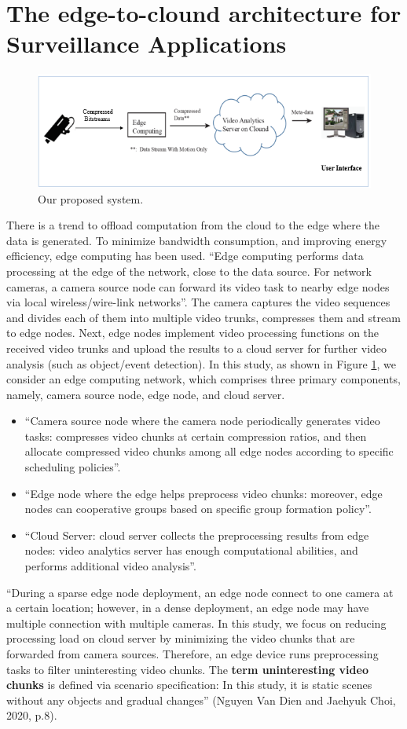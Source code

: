 \section{The edge-to-clound architecture for Surveillance Applications}
\begin{figure}
\centering
 \includegraphics[width=1.0\linewidth]{Figures/arch.png}
 \caption{ Our proposed system.}
 \label{fig:arch}
\end{figure}
There is a trend to offload computation from the cloud to the edge where the data is generated. To minimize bandwidth consumption, and improving energy efficiency, edge computing has been used. “Edge computing performs data processing at the edge of the network, close to the data source. For network cameras, a camera source node can forward its video task to nearby edge nodes via local wireless/wire-link networks”. The camera captures the video sequences and divides each of them into multiple video trunks, compresses them and stream to edge nodes. Next, edge nodes implement video processing functions on the received video trunks and upload the results to a cloud server for further video analysis (such as object/event detection). In this study, as shown in Figure \ref{fig:arch}, we consider an edge computing network, which comprises three primary components, namely, camera source node, edge node, and cloud server.
\begin{itemize}
\item “Camera source node where the camera node periodically generates video tasks: compresses video chunks at certain compression ratios, and then allocate compressed video chunks among all edge nodes according to specific scheduling policies”.
\item “Edge node where the edge helps preprocess video chunks: moreover, edge nodes can cooperative groups based on specific group formation policy”.
\item “Cloud Server: cloud server collects the preprocessing results from edge nodes: video analytics server has enough computational abilities, and performs additional video analysis”.
\end{itemize}
 “During a sparse edge node deployment, an edge node  connect to one camera  at a certain location; however, in a dense deployment, an edge node may have multiple connection with multiple cameras. In this study, we focus on reducing processing load on cloud server by minimizing the video chunks that are forwarded from camera sources. Therefore, an edge device runs preprocessing tasks to filter uninteresting video chunks. The \textbf{term uninteresting video chunks} is defined via scenario specification: In this study, it is static scenes without any objects and gradual changes” (Nguyen Van Dien and Jaehyuk Choi, 2020, p.8).

